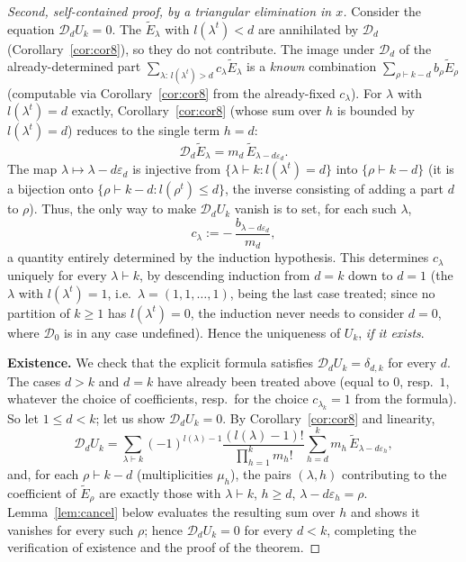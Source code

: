 \documentclass[10pt,a4paper]{amsart}
\begin{document}
\begin{proof}[Second, self-contained proof, by a triangular elimination in $x$]
Consider the equation $\mathcal D_dU_k=0$. The $\widetilde E_\lambda$ with $l(\lambda^t)<d$ are annihilated by $\mathcal D_d$ (Corollary~\ref{cor:cor8}), so they do not contribute. The image under $\mathcal D_d$ of the already-determined part $\sum_{\lambda:\,l(\lambda^t)>d}c_\lambda\widetilde E_\lambda$ is a \emph{known} combination $\sum_{\rho\vdash k-d}b_\rho\widetilde E_\rho$ (computable via Corollary~\ref{cor:cor8} from the already-fixed $c_\lambda$). For $\lambda$ with $l(\lambda^t)=d$ exactly, Corollary~\ref{cor:cor8} (whose sum over $h$ is bounded by $l(\lambda^t)=d$) reduces to the single term $h=d$:
\[
\mathcal D_d\widetilde E_\lambda = m_d\,\widetilde E_{\lambda-d\varepsilon_d}.
\]
The map $\lambda\mapsto\lambda-d\varepsilon_d$ is injective from $\{\lambda\vdash k: l(\lambda^t)=d\}$ into $\{\rho\vdash k-d\}$ (it is a bijection onto $\{\rho\vdash k-d: l(\rho^t)\le d\}$, the inverse consisting of adding a part $d$ to $\rho$). Thus, the only way to make $\mathcal D_dU_k$ vanish is to set, for each such $\lambda$,
\[
c_\lambda := -\,\frac{b_{\lambda-d\varepsilon_d}}{m_d},
\]
a quantity entirely determined by the induction hypothesis. This determines $c_\lambda$ uniquely for every $\lambda\vdash k$, by descending induction from $d=k$ down to $d=1$ (the $\lambda$ with $l(\lambda^t)=1$, i.e.\ $\lambda=(1,1,\dots,1)$, being the last case treated; since no partition of $k\ge1$ has $l(\lambda^t)=0$, the induction never needs to consider $d=0$, where $\mathcal D_0$ is in any case undefined). Hence the uniqueness of $U_k$, \emph{if it exists}.

\smallskip
\noindent\textbf{Existence.} We check that the explicit formula satisfies $\mathcal D_dU_k=\delta_{d,k}$ for every $d$. The cases $d>k$ and $d=k$ have already been treated above (equal to $0$, resp.\ $1$, whatever the choice of coefficients, resp.\ for the choice $c_{\lambda_k}=1$ from the formula). So let $1\le d<k$; let us show $\mathcal D_dU_k=0$. By Corollary~\ref{cor:cor8} and linearity,
\[
\mathcal D_dU_k = \sum_{\lambda\vdash k}(-1)^{l(\lambda)-1}\frac{(l(\lambda)-1)!}{\prod_{h=1}^k m_h!}\sum_{h=d}^{k}m_h\,\widetilde E_{\lambda-d\varepsilon_h},
\]
and, for each $\rho\vdash k-d$ (multiplicities $\mu_h$), the pairs $(\lambda,h)$ contributing to the coefficient of $\widetilde E_\rho$ are exactly those with $\lambda\vdash k$, $h\ge d$, $\lambda-d\varepsilon_h=\rho$. Lemma~\ref{lem:cancel} below evaluates the resulting sum over $h$ and shows it vanishes for every such $\rho$; hence $\mathcal D_dU_k=0$ for every $d<k$, completing the verification of existence and the proof of the theorem.
\end{proof}
\end{document}
